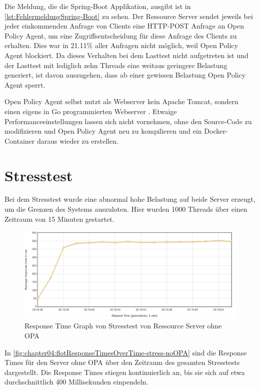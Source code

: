 Die Meldung, die die Spring-Boot Applikation, ausgibt ist in \autoref{lst:FehlermeldungSpring-Boot} zu sehen. Der Ressource Server sendet jeweils bei jeder einkommenden Anfrage von Clients eine HTTP-POST Anfrage an Open Policy Agent, um eine Zugriffsentscheidung für diese Anfrage des Clients zu erhalten. Dies war in 21.11\% aller Anfragen nicht möglich, weil Open Policy Agent blockiert. Da dieses Verhalten bei dem Lasttest nicht aufgetreten ist und der Lasttest mit lediglich zehn Threads eine weitaus geringere Belastung generiert, ist davon auszugehen, dass ab einer gewissen Belastung Open Policy Agent sperrt.\smallskip

Open Policy Agent selbst nutzt als Webserver kein Apache Tomcat, sondern einen eigens in Go programmierten Webserver \citep{opagithub:2021}. Etwaige Performanceeinstellungen lassen sich nicht vornehmen, ohne den Source-Code zu modifizieren und Open Policy Agent neu zu kompilieren und ein Docker-Container daraus wieder zu erstellen. 

\section{Stresstest}
Bei dem Stresstest wurde eine abnormal hohe Belastung auf beide Server erzeugt, um die Grenzen des Systems auszuloten. Hier wurden 1000 Threads über einen Zeitraum von 15 Minuten gestartet. 

\begin{figure}[H]
  \centering
  \includegraphics[width=1.0\textwidth]{gfx/flotResponseTimesOverTime-stress-noOPA.png}
  \caption{Response Time Graph von Stresstest von Ressource Server ohne OPA}
  \label{fig:chapter04:flotResponseTimesOverTime-stress-noOPA}
\end{figure}

In \autoref{fig:chapter04:flotResponseTimesOverTime-stress-noOPA} sind die Response Times für den Server ohne OPA über den Zeitraum des gesamten Stresstests dargestellt. Die Response Times stiegen kontinuierlich an, bis sie sich auf etwa durchschnittlich 400 Millisekunden einpendeln. 

